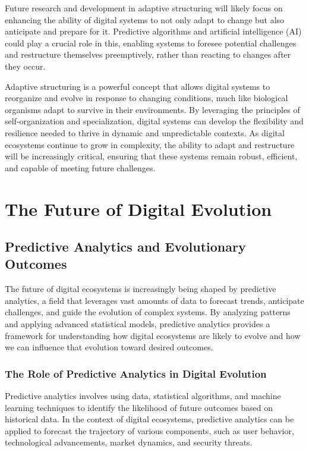 \documentclass[12pt,twoside]{article}
\begin{document}
Future research and development in adaptive structuring will likely focus on enhancing the ability of digital systems to not only adapt to change but also anticipate and prepare for it. Predictive algorithms and artificial intelligence (AI) could play a crucial role in this, enabling systems to foresee potential challenges and restructure themselves preemptively, rather than reacting to changes after they occur.

Adaptive structuring is a powerful concept that allows digital systems to reorganize and evolve in response to changing conditions, much like biological organisms adapt to survive in their environments. By leveraging the principles of self-organization and specialization, digital systems can develop the flexibility and resilience needed to thrive in dynamic and unpredictable contexts. As digital ecosystems continue to grow in complexity, the ability to adapt and restructure will be increasingly critical, ensuring that these systems remain robust, efficient, and capable of meeting future challenges.


\section{The Future of Digital Evolution}
\subsection{Predictive Analytics and Evolutionary Outcomes}
The future of digital ecosystems is increasingly being shaped by predictive analytics, a field that leverages vast amounts of data to forecast trends, anticipate challenges, and guide the evolution of complex systems. By analyzing patterns and applying advanced statistical models, predictive analytics provides a framework for understanding how digital ecosystems are likely to evolve and how we can influence that evolution toward desired outcomes.

\subsubsection{The Role of Predictive Analytics in Digital Evolution}

Predictive analytics involves using data, statistical algorithms, and machine learning techniques to identify the likelihood of future outcomes based on historical data. In the context of digital ecosystems, predictive analytics can be applied to forecast the trajectory of various components, such as user behavior, technological advancements, market dynamics, and security threats.
\end{document}

